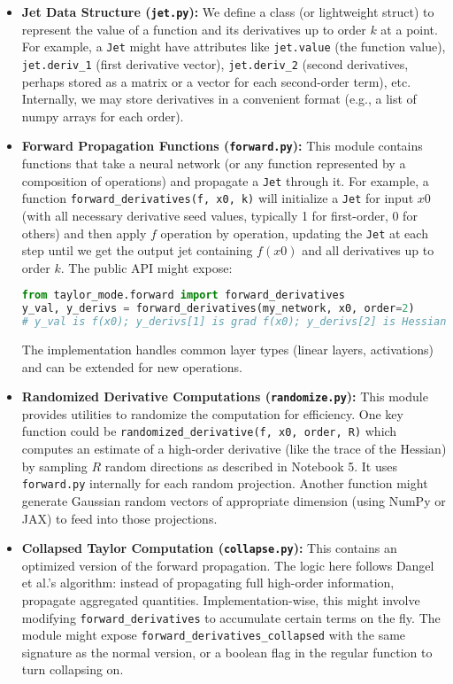 \documentclass[11pt]{article}
\begin{document}
\begin{itemize}
  \item \textbf{Jet Data Structure (\texttt{jet.py}):} We define a class (or lightweight struct) to represent the value of a function and its derivatives up to order $k$ at a point. For example, a \texttt{Jet} might have attributes like \texttt{jet.value} (the function value), \texttt{jet.deriv\_1} (first derivative vector), \texttt{jet.deriv\_2} (second derivatives, perhaps stored as a matrix or a vector for each second-order term), etc. Internally, we may store derivatives in a convenient format (e.g., a list of numpy arrays for each order).
  \item \textbf{Forward Propagation Functions (\texttt{forward.py}):} This module contains functions that take a neural network (or any function represented by a composition of operations) and propagate a \texttt{Jet} through it. For example, a function \texttt{forward\_derivatives(f, x0, k)} will initialize a \texttt{Jet} for input $x0$ (with all necessary derivative seed values, typically 1 for first-order, 0 for others) and then apply $f$ operation by operation, updating the \texttt{Jet} at each step until we get the output jet containing $f(x0)$ and all derivatives up to order $k$. The public API might expose:
  \begin{lstlisting}[language=Python, caption=Example usage of Taylor-mode API]
from taylor_mode.forward import forward_derivatives
y_val, y_derivs = forward_derivatives(my_network, x0, order=2)
# y_val is f(x0); y_derivs[1] is grad f(x0); y_derivs[2] is Hessian (or its diagonal) etc.
  \end{lstlisting}
  The implementation handles common layer types (linear layers, activations) and can be extended for new operations.
  \item \textbf{Randomized Derivative Computations (\texttt{randomize.py}):} This module provides utilities to randomize the computation for efficiency. One key function could be \texttt{randomized_derivative(f, x0, order, R)} which computes an estimate of a high-order derivative (like the trace of the Hessian) by sampling $R$ random directions as described in Notebook 5. It uses \texttt{forward.py} internally for each random projection. Another function might generate Gaussian random vectors of appropriate dimension (using NumPy or JAX) to feed into those projections.
  \item \textbf{Collapsed Taylor Computation (\texttt{collapse.py}):} This contains an optimized version of the forward propagation. The logic here follows Dangel et al.'s algorithm: instead of propagating full high-order information, propagate aggregated quantities. Implementation-wise, this might involve modifying \texttt{forward\_derivatives} to accumulate certain terms on the fly. The module might expose \texttt{forward_derivatives\_collapsed} with the same signature as the normal version, or a boolean flag in the regular function to turn collapsing on.
\end{itemize}
\end{document}
